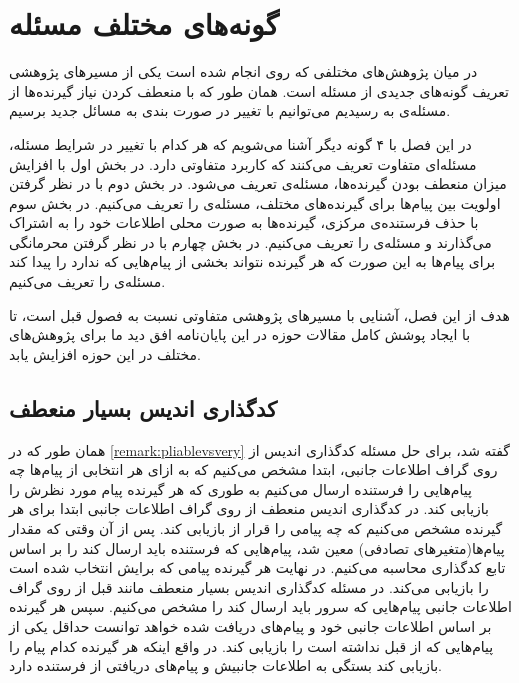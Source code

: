 
\chapter{
    گونه‌های مختلف مسئله
}
\label{chapter:varients}
در میان پژوهش‌های مختلفی که روی 
\picod
انجام شده است یکی از مسیرهای پژوهشی تعریف گونه‌های جدیدی از مسئله است. همان طور که با منعطف کردن نیاز گیرنده‌ها از مسئله‌ی
\icod
به
\picod
رسیدیم می‌توانیم با تغییر در صورت بندی
\picod
به مسائل جدید برسیم.

در این فصل با ۴ گونه دیگر آشنا می‌شویم که هر کدام با تغییر در شرایط مسئله، مسئله‌ای متفاوت تعریف می‌کنند که کاربرد متفاوتی دارد. در بخش اول با افزایش میزان منعطف بودن گیرنده‌ها، مسئله‌ی 
 تعریف می‌شود. در بخش دوم با در نظر گرفتن اولویت بین پیام‌ها برای گیرنده‌های مختلف، مسئله‌ی
 را تعریف می‌کنیم. در بخش سوم با حذف فرستنده‌ی مرکزی، گیرنده‌ها به صورت محلی اطلاعات خود را به اشتراک می‌گذارند و مسئله‌ی
 را تعریف می‌کنیم. در بخش چهارم با در نظر گرفتن محرمانگی برای پیام‌ها به این صورت که هر گیرنده نتواند بخشی از پیام‌هایی که ندارد را پیدا کند مسئله‌ی
 را تعریف می‌کنیم.
 
 هدف از این فصل، آشنایی با مسیرهای پژوهشی متفاوتی نسبت به فصول قبل است، تا با ایجاد پوشش کامل مقالات حوزه
 \picod
 در این پایان‌نامه افق دید ما برای پژوهش‌های مختلف در این حوزه افزایش یابد.
 \pagebreak
\section{کدگذاری اندیس بسیار منعطف}
\label{sec:verypliable}
همان طور که در
\autoref{remark:pliablevsvery}
گفته شد، برای حل مسئله کدگذاری اندیس از روی گراف اطلاعات جانبی، ابتدا مشخص می‌کنیم که به ازای هر انتخابی از پیام‌ها چه پیام‌هایی را فرستنده ارسال می‌کنیم به طوری که هر گیرنده پیام مورد نظرش را بازیابی کند. در کدگذاری اندیس منعطف از روی گراف اطلاعات جانبی ابتدا برای هر گیرنده مشخص می‌کنیم که چه پیامی را قرار از بازیابی کند.
پس از آن وقتی که مقدار پیام‌ها(متغیرهای تصادفی) معین شد، پیام‌هایی که فرستنده باید ارسال کند را بر اساس تابع کدگذاری محاسبه می‌کنیم. در نهایت هر گیرنده پیامی که برایش انتخاب شده است را بازیابی می‌کند.
در مسئله کدگذاری اندیس بسیار منعطف مانند قبل از روی گراف اطلاعات جانبی پیام‌هایی که سرور باید ارسال کند را مشخص می‌کنیم. سپس هر گیرنده بر اساس اطلاعات جانبی خود و پیام‌های دریافت شده خواهد توانست حداقل یکی از پیام‌هایی که از قبل نداشته است را بازیابی کند. در واقع اینکه هر گیرنده کدام پیام را بازیابی کند بستگی به اطلاعات جانبیش و پیام‌های دریافتی از فرستنده دارد.


